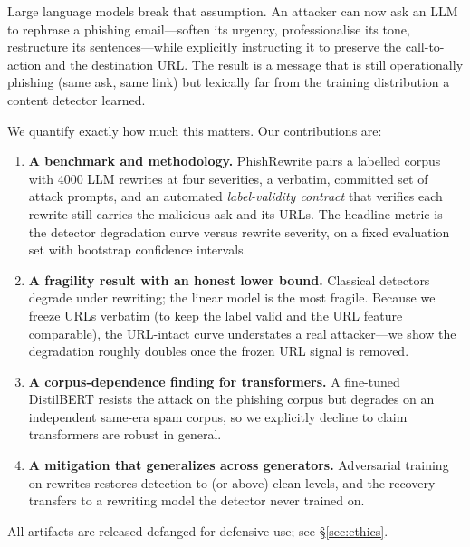 \documentclass[11pt]{article}
\begin{document}
Large language models break that assumption. An attacker can now ask an LLM to
rephrase a phishing email---soften its urgency, professionalise its tone,
restructure its sentences---while explicitly instructing it to preserve the
call-to-action and the destination URL. The result is a message that is still
operationally phishing (same ask, same link) but lexically far from the training
distribution a content detector learned.

We quantify exactly how much this matters. Our contributions are:
\begin{enumerate}
  \item \textbf{A benchmark and methodology.} PhishRewrite pairs a labelled corpus
  with \num{4000} LLM rewrites at four severities, a verbatim, committed set of
  attack prompts, and an automated \emph{label-validity contract} that verifies each
  rewrite still carries the malicious ask and its URLs. The headline metric is the
  detector degradation curve versus rewrite severity, on a fixed evaluation set with
  bootstrap confidence intervals.
  \item \textbf{A fragility result with an honest lower bound.} Classical detectors
  degrade under rewriting; the linear model is the most fragile. Because we freeze
  URLs verbatim (to keep the label valid and the URL feature comparable), the
  URL-intact curve understates a real attacker---we show the degradation roughly
  doubles once the frozen URL signal is removed.
  \item \textbf{A corpus-dependence finding for transformers.} A fine-tuned
  DistilBERT resists the attack on the phishing corpus but degrades on an
  independent same-era spam corpus, so we explicitly decline to claim transformers
  are robust in general.
  \item \textbf{A mitigation that generalizes across generators.} Adversarial
  training on rewrites restores detection to (or above) clean levels, and the
  recovery transfers to a rewriting model the detector never trained on.
\end{enumerate}

All artifacts are released defanged for defensive use; see \S\ref{sec:ethics}.
\end{document}
